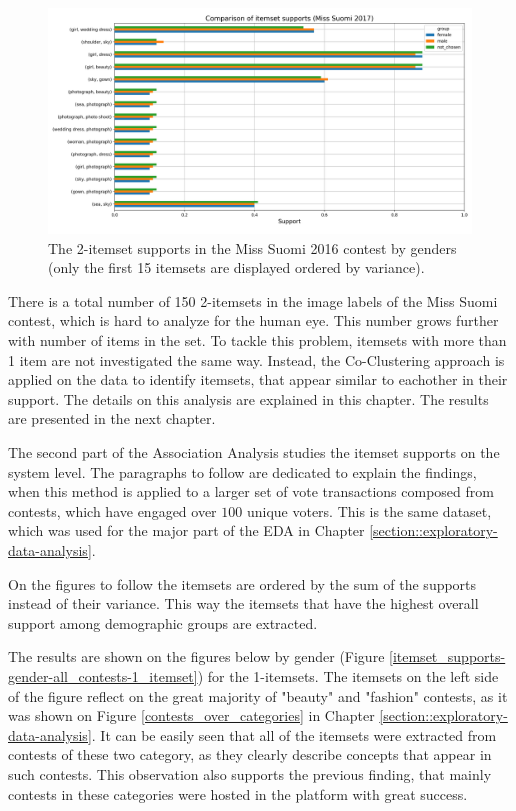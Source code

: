 \begin{figure}[h] 
    \begin{center}
        \includegraphics[width=1.0\textwidth]{Images/itemset_supports-gender-Miss_Helsinki-2_itemset.png}
        \caption{The 2-itemset supports in the Miss Suomi 2016 contest by genders (only the first 15 itemsets are displayed ordered by variance).}
        \label{itemset_supports-gender-Miss_Helsinki-2_itemset}
    \end{center}
\end{figure}

There is a total number of 150 2-itemsets in the image labels of the Miss Suomi contest, which is hard to analyze for the human eye. This number grows further with number of items in the set. To tackle this problem, itemsets with more than 1 item are not investigated the same way. Instead, the Co-Clustering approach is applied on the data to identify itemsets, that appear similar to eachother in their support. The details on this analysis are explained in this chapter. The results are presented in the next chapter.

The second part of the Association Analysis studies the itemset supports on the system level. The paragraphs to follow are dedicated to explain the findings, when this method is applied to a larger set of vote transactions composed from contests, which have engaged over $100$ unique voters. This is the same dataset, which was used for the major part of the EDA in Chapter \ref{section::exploratory-data-analysis}. 

On the figures to follow the itemsets are ordered by the sum of the supports instead of their variance. This way the itemsets that have the highest overall support among demographic groups are extracted.

The results are shown on the figures below by gender (Figure \ref{itemset_supports-gender-all_contests-1_itemset}) for the 1-itemsets. The itemsets on the left side of the figure reflect on the great majority of "beauty" and "fashion" contests, as it was shown on Figure \ref{contests_over_categories} in Chapter \ref{section::exploratory-data-analysis}. It can be easily seen that all of the itemsets were extracted from contests of these two category, as they clearly describe concepts that appear in such contests. This observation also supports the previous finding, that mainly contests in these categories were hosted in the platform with great success.


